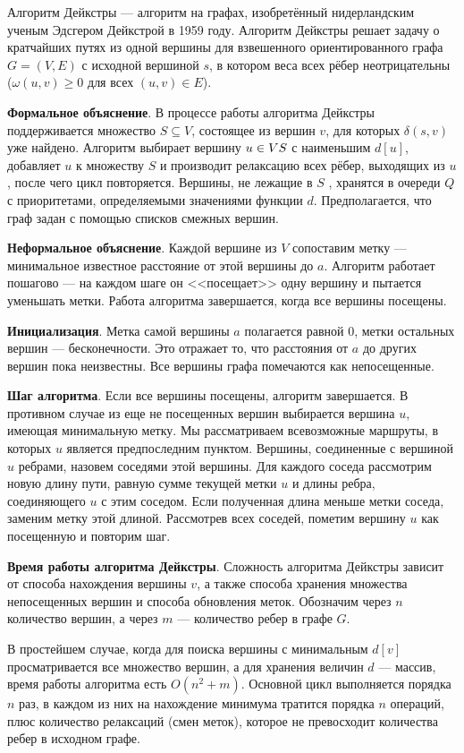 Алгоритм Дейкстры --- алгоритм на графах, изобретённый нидерландским ученым Эдсгером Дейкстрой в 1959 году. Алгоритм Дейкстры решает задачу о кратчайших путях из одной вершины для взвешенного ориентированного графа $G = (V, E)$ с исходной вершиной $s$, в котором веса всех рёбер неотрицательны ($\omega(u, v) \geqslant 0$ для всех $(u, v) \in E$).

\textbf{Формальное объяснение}.
В процессе работы алгоритма Дейкстры поддерживается множество $S\subseteq V$, состоящее из вершин $v$, для которых $\delta(s, v)$ уже найдено. 
Алгоритм выбирает вершину $u \in V\\S$ с наименьшим $d[u]$, добавляет $u$ к множеству $S$ и производит релаксацию всех рёбер, выходящих из $u$, после чего цикл повторяется. 
Вершины, не лежащие в $S$ , хранятся в очереди $Q$ с приоритетами, определяемыми значениями функции $d$. Предполагается, что граф задан с помощью списков смежных вершин.

\textbf{Неформальное объяснение}.
Каждой вершине из $V$ сопоставим метку --- минимальное известное расстояние от этой вершины до $a$. 
Алгоритм работает пошагово --- на каждом шаге он <<посещает>> одну вершину и пытается уменьшать метки. 
Работа алгоритма завершается, когда все вершины посещены.

\textbf{Инициализация}. 
Метка самой вершины $a$ полагается равной $0$, метки остальных вершин --- бесконечности. 
Это отражает то, что расстояния от $a$ до других вершин пока неизвестны. 
Все вершины графа помечаются как непосещенные.

\textbf{Шаг алгоритма}. 
Если все вершины посещены, алгоритм завершается. 
В противном случае из еще не посещенных вершин выбирается вершина $u$, имеющая минимальную метку. 
Мы рассматриваем всевозможные маршруты, в которых $u$ является предпоследним пунктом. 
Вершины, соединенные с вершиной $u$ ребрами, назовем соседями этой вершины. 
Для каждого соседа рассмотрим новую длину пути, равную сумме текущей метки $u$ и длины ребра, соединяющего $u$ с этим соседом. 
Если полученная длина меньше метки соседа, заменим метку этой длиной. 
Рассмотрев всех соседей, пометим вершину $u$ как посещенную и повторим шаг.

\textbf{Время работы алгоритма Дейкстры}.
Сложность алгоритма Дейкстры зависит от способа нахождения вершины $v$, а также способа хранения множества непосещенных вершин и способа обновления меток. 
Обозначим через $n$ количество вершин, а через $m$ --- количество ребер в графе $G$.

В простейшем случае, когда для поиска вершины с минимальным $d[v]$ просматривается все множество вершин, а для хранения величин $d$ --- массив, время работы алгоритма есть $O(n^2 + m)$. 
Основной цикл выполняется порядка $n$ раз, в каждом из них на нахождение минимума тратится порядка $n$ операций, плюс количество релаксаций (смен меток), которое не превосходит количества ребер в исходном графе.


